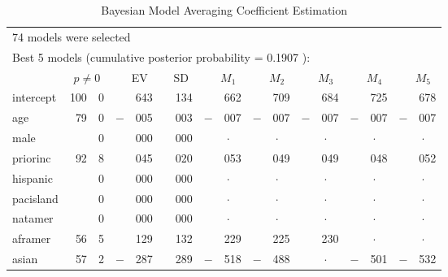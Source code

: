 \begin{table}[t]
\begin{center}
\caption{Bayesian Model Averaging Coefficient Estimation}
\vspace{0.1cm}
\footnotesize
\begin{tabular}{lr@{.}lr@{.}lr@{.}lr@{.}lr@{.}lr@{.}lr@{.}lr@{.}l}
  \hline
  \multicolumn{17}{l}{74 models were selected}  \\
  \multicolumn{17}{l}{Best  5  models (cumulative posterior probability =  0.1907 ):}  \\ \hline
  & \multicolumn{2}{c}{$p\neq 0$} & \multicolumn{2}{c}{\ \ EV} & \multicolumn{2}{c}{ \ SD} & \multicolumn{2}{c}{\ \ $M_1$} & \multicolumn{2}{c}{\ \ $M_2$} & \multicolumn{2}{c}{\ \ $M_3$} & \multicolumn{2}{c}{\ \ $M_4$} & \multicolumn{2}{c}{\ \ $M_5$} \\ \hline
intercept    & 100 & 0 &   & 643 &   & 134 &   & 662 &   & 709 &   & 684 &   & 725 &   & 678 \\
age          &  79 & 0 &$-$& 005 &   & 003 &$-$& 007 &$-$& 007 &$-$& 007 &$-$& 007 &$-$& 007 \\
male         &     & 0 &   & 000 &   & 000 & \multicolumn{2}{c}{\ \ $\cdot$} & \multicolumn{2}{c}{\ \ $\cdot$} & \multicolumn{2}{c}{\ \ $\cdot$} & \multicolumn{2}{c}{\ \ $\cdot$} & \multicolumn{2}{c}{\ \ $\cdot$} \\
priorinc    &  92 & 8 &   & 045 &   & 020 &   & 053 &   & 049 &   & 049 &   & 048 &   & 052 \\
hispanic     &     & 0 &   & 000 &   & 000 & \multicolumn{2}{c}{\ \ $\cdot$} & \multicolumn{2}{c}{\ \ $\cdot$} & \multicolumn{2}{c}{\ \ $\cdot$} & \multicolumn{2}{c}{\ \ $\cdot$} & \multicolumn{2}{c}{\ \ $\cdot$} \\
pacisland  &     & 0 &   & 000 &   & 000 & \multicolumn{2}{c}{\ \ $\cdot$} & \multicolumn{2}{c}{\ \ $\cdot$} & \multicolumn{2}{c}{\ \ $\cdot$} & \multicolumn{2}{c}{\ \ $\cdot$} & \multicolumn{2}{c}{\ \ $\cdot$} \\
natamer    &     & 0 &   & 000 &   & 000 & \multicolumn{2}{c}{\ \ $\cdot$} & \multicolumn{2}{c}{\ \ $\cdot$} & \multicolumn{2}{c}{\ \ $\cdot$} & \multicolumn{2}{c}{\ \ $\cdot$} & \multicolumn{2}{c}{\ \ $\cdot$} \\
aframer    &  56 & 5 &   & 129 &   & 132 &   & 229 &   & 225 &   & 230   & \multicolumn{2}{c}{\ \ $\cdot$} & \multicolumn{2}{c}{\ \ $\cdot$} \\
asian        &  57 & 2 &$-$& 287 &   & 289 &$-$& 518 &$-$& 488  & \multicolumn{2}{c}{\ \ $\cdot$} &$-$& 501 &$-$& 532 \\

\end{tabular}
\end{center}
\end{table}
